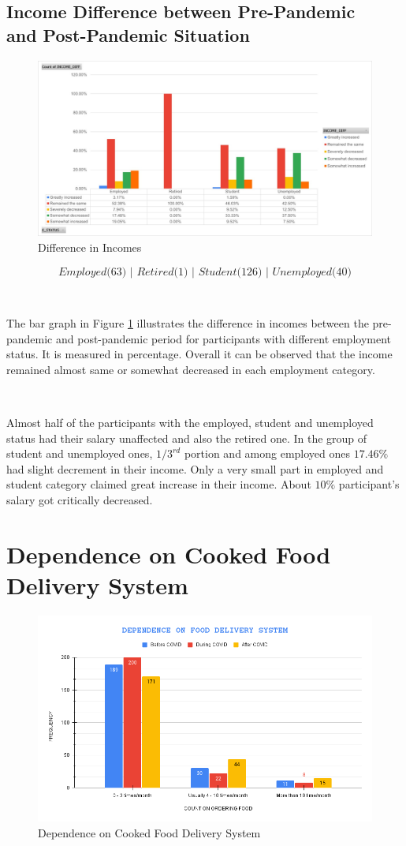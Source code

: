 \subsection{Income Difference between Pre-Pandemic\\ and Post-Pandemic Situation}

\begin{figure}[h!]
	\centering
	\includegraphics[width=0.8\linewidth]{IMAGES/Image 5.jpg}
	\caption{Difference in Incomes}
	\label{G5}
\end{figure}
$$\textit{Employed($63$) | Retired($1$) | Student($126$) | Unemployed($40$)}$$

\ 

The bar graph in Figure \ref{G5} illustrates the difference in incomes between the pre-pandemic and post-pandemic period for participants with different employment status. It is measured in percentage. Overall it can be observed that the income remained almost same or somewhat decreased in each employment category.

\ 

Almost half of the participants with the employed, student and unemployed status had their salary unaffected and also the retired one. In the group of student and unemployed ones, $1/3^{rd}$  portion and among employed ones $17.46\%$  had slight decrement in their income. Only a very small part in employed and student category claimed great increase in their income. About $10\%$ participant's salary got critically decreased. 

\newpage

\section{Dependence on Cooked Food Delivery System}

\begin{figure}[h!]
	\centering
	\includegraphics[width=0.8\linewidth]{IMAGES/Image 13.png}
	\caption{Dependence on Cooked Food Delivery System}
	\label{G13}
\end{figure}

